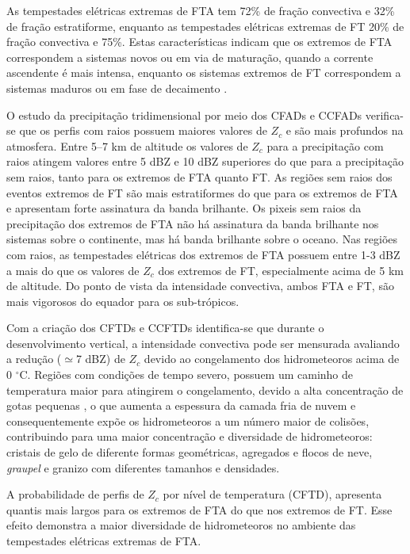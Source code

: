 As tempestades elétricas extremas de FTA tem 72\% de fração convectiva e 32\% de fração estratiforme, enquanto as tempestades elétricas extremas de FT 20\% de fração convectiva e 75\%. Estas características indicam que os extremos de FTA correspondem a sistemas novos ou em via de maturação, quando a corrente ascendente é mais intensa, enquanto os sistemas extremos de FT correspondem a sistemas maduros ou em fase de decaimento \cite{learyHouse1979}. 


O estudo da precipitação tridimensional por meio dos CFADs e CCFADs verifica-se que os perfis com raios possuem maiores valores de  $Z_c$ e são mais profundos na atmosfera. Entre 5--7 km de altitude os valores de $Z_c$ para a precipitação com raios atingem valores entre 5 dBZ e 10 dBZ superiores do que para a precipitação sem raios, tanto para os extremos de FTA quanto FT. As regiões sem raios dos eventos extremos de FT são mais estratiformes do que para os extremos de FTA e apresentam forte assinatura da banda brilhante. Os pixeis sem raios da precipitação dos extremos de FTA não há assinatura da banda brilhante nos sistemas sobre o continente, mas há banda brilhante sobre o oceano. Nas regiões com raios, as tempestades elétricas dos extremos de FTA possuem entre 1-3 dBZ a mais do que os valores de $Z_c$ dos extremos de FT, especialmente acima de 5 km de altitude. Do ponto de vista da intensidade convectiva, ambos FTA e FT, são mais vigorosos do equador para os sub-trópicos. 


Com a criação dos CFTDs e CCFTDs identifica-se que durante o desenvolvimento vertical, a intensidade convectiva pode ser mensurada avaliando a redução ($\simeq$7 dBZ) de $Z_c$ devido ao congelamento dos hidrometeoros acima de 0 $^{\circ}$C. Regiões com condições de tempo severo, possuem um caminho de temperatura maior para atingirem o congelamento, devido a alta concentração de gotas pequenas \cite{bigg1953}, o que aumenta a espessura da camada fria de nuvem e consequentemente  expõe os hidrometeoros a um número maior de colisões, contribuindo para uma maior concentração e diversidade de hidrometeoros: cristais de gelo de diferente formas geométricas, agregados e flocos de neve, \textit{graupel} e granizo com diferentes tamanhos e densidades. 

A probabilidade de perfis de $Z_c$ por nível de temperatura (CFTD), apresenta quantis mais largos para os extremos de FTA do que nos extremos de FT. Esse efeito demonstra a maior diversidade de hidrometeoros no ambiente das tempestades elétricas extremas de FTA.    


